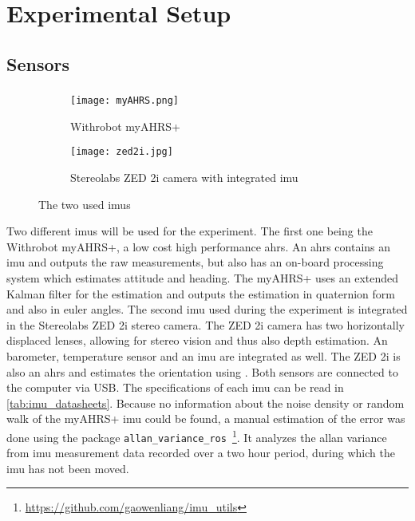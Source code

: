 \chapter{Experimental Setup}
\label{ch:ExperimentalSetup}

\section{Sensors}
\subsection{}
\begin{figure}[htb]
	\centering
	\begin{subfigure}[b]{0.4\textwidth}
		\centering
		\texttt{[image: myAHRS.png]}
		\caption{Withrobot myAHRS+ \cite{Withrobot2017}}
		\label{fig:imu_myahrs}
	\end{subfigure}
	\begin{subfigure}[b]{0.4\textwidth}
		\centering
		\texttt{[image: zed2i.jpg]}
		\caption{Stereolabs ZED 2i camera with integrated \acrshort{imu} \cite{Stereolabs2019}}
		\label{fig:imu_zed}
	\end{subfigure}
	\caption{The two used \acrshort{imu}s}
	\label{fig:imus_used}
\end{figure}
Two different \gls{imu}s will be used for the experiment.
The first one being the Withrobot myAHRS+, a low cost high performance \gls{ahrs}.
An \gls{ahrs} contains an \gls{imu} and outputs the raw measurements, but also has an on-board processing system which estimates attitude and heading.
The myAHRS+ uses an extended Kalman filter for the estimation and outputs the estimation in quaternion form and also in euler angles.
The second \gls{imu} used during the experiment is integrated in the Stereolabs ZED 2i stereo camera.
The ZED 2i camera has two horizontally displaced lenses, allowing for stereo vision and thus also depth estimation.
An barometer, temperature sensor and an \gls{imu} are integrated as well.
The ZED 2i is also an \gls{ahrs} and estimates the orientation using .
Both sensors are connected to the computer via USB.
The specifications of each \gls{imu} can be read in \cref{tab:imu_datasheets}.
Because no information about the noise density or random walk of the myAHRS+ \gls{imu} could be found, a manual estimation of the error was done using the package \texttt{allan\_variance\_ros}~\footnote{\url{https://github.com/gaowenliang/imu_utils}}.
It analyzes the allan variance from \gls{imu} measurement data recorded over a two hour period, during which the \gls{imu} has not been moved.

